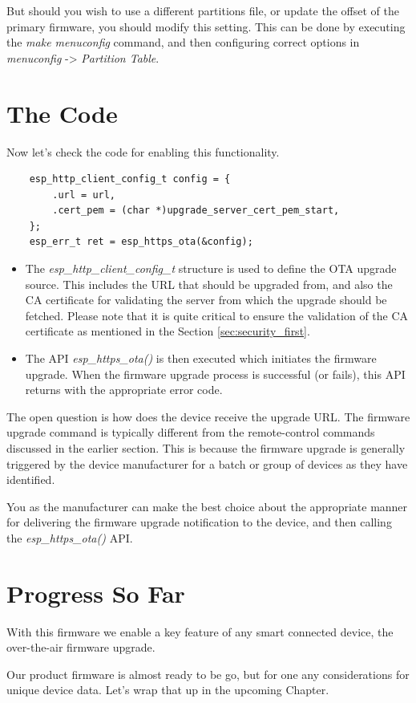 \documentclass[main.tex]{subfiles}
\begin{document}
But should you wish to use a different partitions file, or update the offset of the primary firmware, you should modify this setting. This can be done by executing the \textit{make menuconfig} command, and then configuring correct options in \textit{menuconfig} -> \textit{Partition Table}.

\section{The Code}
Now let's check the code for enabling this functionality.

\begin{verbatim}
    esp_http_client_config_t config = {
        .url = url,
        .cert_pem = (char *)upgrade_server_cert_pem_start,
    };
    esp_err_t ret = esp_https_ota(&config);
\end{verbatim}

\begin{itemize}
    \item The \textit{esp\_http\_client\_config\_t} structure is used to define the OTA upgrade source. This includes the URL that should be upgraded from, and also the CA certificate for validating the server from which the upgrade should be fetched. Please note that it is quite critical to ensure the validation of the CA certificate as mentioned in the Section \ref{sec:security_first}.
    \item The API \textit{esp\_https\_ota()} is then executed which initiates the firmware upgrade. When the firmware upgrade process is successful (or fails), this API returns with the appropriate error code.
\end{itemize}

The open question is how does the device receive the upgrade URL. The firmware upgrade command is typically different from the remote-control commands discussed in the earlier section. This is because the firmware upgrade is generally triggered by the device manufacturer for a batch or group of devices as they have identified.

You as the manufacturer can make the best choice about the appropriate manner for delivering the firmware upgrade notification to the device, and then calling the \textit{esp\_https\_ota()} API.

\section{Progress So Far}
With this firmware we enable a key feature of any smart connected device, the over-the-air firmware upgrade. 

Our product firmware is almost ready to be go, but for one any considerations for unique device data. Let's wrap that up in the upcoming Chapter.
\end{document}
